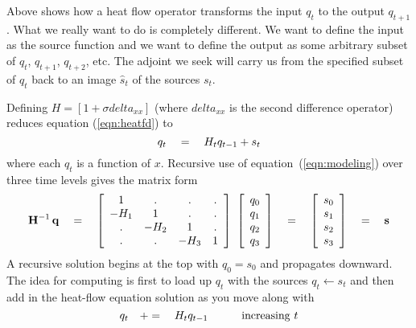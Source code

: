 Above shows how
a heat flow operator transforms
the input $q_t$ to the output $q_{t+1}$.
What we really want to do is completely different.
We want to define the input as the source function
and we want to define the output as some arbitrary subset
of $q_t$, $q_{t+1}$, $q_{t+2}$, etc.
The adjoint we seek will carry us
from the specified subset of  $q_t$
back to an image $\hat s_t$ of the sources $s_t$.

\par
Defining $H=[1+\sigma delta_{xx}]$
(where $delta_{xx}$ is the second difference operator)
reduces equation (\ref{eqn:heatfd}) to
\begin{equation}                                          \label{eqn:modeling}
q_{t} \quad =\quad H_{t} q_{t-1} + s_{t}
\end{equation}
where each $q_t$ is a function of $x$.
Recursive use of equation~(\ref{eqn:modeling})
over three time levels gives the matrix form
\begin{equation}
{\bold H}^{-1} \, \bold q \eq
\left[
	\begin{array}{cccc}
		 1  &  .    & .    &  .    \\
		-H_1&  1    &  .   &  .    \\
		 .  & -H_2  & 1    &  .    \\
		 .  &  .    & -H_3 &  1
	\end{array}
	\right] \ 
\left[
	\begin{array}{c}
		q_0 \\
		q_1 \\
		q_2 \\
		q_3
	\end{array}
	\right]
\eq
\left[
	\begin{array}{c}
		s_0 \\
		s_1 \\
		s_2 \\
		s_3
	\end{array}
	\right]
\eq \bold s
\label{eqn:matrecur}
\end{equation}
A recursive solution begins at the top
with $q_0=s_0$ and propagates downward.
The idea for computing is first to load up $q_{t}$ with the sources
$q_t\leftarrow s_t$
and then add in the heat-flow equation solution as you move along with
\begin{equation}
q_{t} \quad +=\quad H_{t} q_{t-1} \quad\quad\quad {\rm increasing}\ t
\end{equation}

